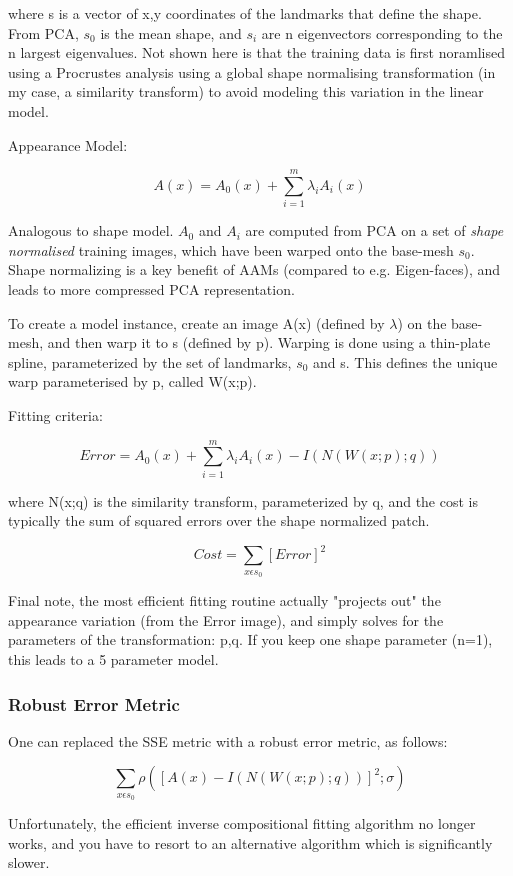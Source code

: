 \documentclass[10pt,twocolumn,letterpaper]{article}
\begin{document}
where s is a vector of x,y coordinates of the landmarks that define the shape.  From PCA, $s_0$ is the mean shape, and $s_i$ are n eigenvectors corresponding to the n largest eigenvalues.  Not shown here is that the training data is first noramlised using a Procrustes analysis using a global shape normalising transformation (in my case, a similarity transform) to avoid modeling this variation in the linear model.

Appearance Model:

\[A(x) = A_0(x) + \sum_{i=1}^m \lambda_i A_i(x)\]

Analogous to shape model. $A_0$ and $A_i$ are computed from PCA on a set of \emph{shape normalised} training images, which have been warped onto the base-mesh $s_0$.  Shape normalizing is a key benefit of AAMs (compared to e.g. Eigen-faces), and leads to more compressed PCA representation.

To create a model instance, create an image A(x) (defined by $\lambda$) on the base-mesh, and then warp it to s (defined by p).  Warping is done using a thin-plate spline, parameterized by the set of landmarks, $s_0$ and s.  This defines the unique warp parameterised by p, called W(x;p).

Fitting criteria:

\[Error = A_0(x) + \sum_{i=1}^m \lambda_i A_i(x) - I(N(W(x;p);q)) \]

where N(x;q) is the similarity transform, parameterized by q, and the cost is typically the sum of squared errors over the shape normalized patch.

\[Cost = \sum_{x \epsilon s_0} [Error]^2 \]

Final note, the most efficient fitting routine actually "projects out" the appearance variation (from the Error image), and simply solves for the parameters of the transformation: p,q.  If you keep one shape parameter (n=1), this leads to a 5 parameter model.

\subsubsection{Robust Error Metric}

One can replaced the SSE metric with a robust error metric, as follows:

\[\sum_{x \epsilon s_0} \rho([A(x) - I(N(W(x;p);q))]^2; \sigma)\]

Unfortunately, the efficient inverse compositional fitting algorithm no longer works, and you have to resort to an alternative algorithm which is significantly slower.
\end{document}
